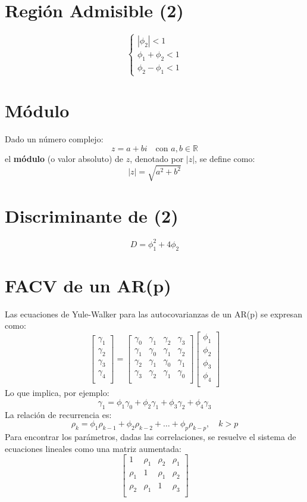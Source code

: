 \documentclass[12pt]{article} %
\begin{document}
\begin{multicols}{3}
\section*{Región Admisible (2)}
\[
\begin{cases}
|\phi_2| < 1 \\
\phi_1 + \phi_2 < 1 \\
\phi_2 - \phi_1 < 1
\end{cases}
\]
\section*{Módulo}
Dado un número complejo:
\[
z = a + bi \quad \text{con } a, b \in \mathbb{R}
\]
el \textbf{módulo} (o valor absoluto) de \( z \), denotado por \( |z| \), se define como:
\[
|z| = \sqrt{a^2 + b^2}
\]
\section*{Discriminante de (2)}
\[
D = \phi_1^2 + 4\phi_2
\]
\section*{FACV de un AR(p)}
Las ecuaciones de Yule-Walker para las autocovarianzas de un AR(p) se expresan como:
\[
\begin{bmatrix}
\gamma_1 \\
\gamma_2 \\
\gamma_3 \\
\gamma_4 \\
\end{bmatrix}
=
\begin{bmatrix}
\gamma_0 & \gamma_1 & \gamma_2 & \gamma_3 \\
\gamma_1 & \gamma_0 & \gamma_1 & \gamma_2 \\
\gamma_2 & \gamma_1 & \gamma_0 & \gamma_1 \\
\gamma_3 & \gamma_2 & \gamma_1 & \gamma_0 \\
\end{bmatrix}
\begin{bmatrix}
\phi_1 \\
\phi_2 \\
\phi_3 \\
\phi_4 \\
\end{bmatrix}
\]
Lo que implica, por ejemplo:
\[
\gamma_1 = \phi_1 \gamma_0 + \phi_2 \gamma_1 + \phi_3 \gamma_2 + \phi_4 \gamma_3
\]
La relación de recurrencia es:
\[
\rho_k = \phi_1 \rho_{k-1} + \phi_2 \rho_{k-2} + \dots + \phi_p \rho_{k-p}, \quad k > p
\]
Para encontrar los parámetros, dadas las correlaciones, se resuelve el sistema de ecuaciones lineales como una matriz aumentada:
\[
\left[
\begin{array}{ccc|c}
1 & \rho_1 & \rho_2 & \rho_1 \\
\rho_1 & 1 & \rho_1 & \rho_2 \\
\rho_2 & \rho_1 & 1 & \rho_3 \\
\end{array}
\right]
\]

\end{multicols}
\end{document}
